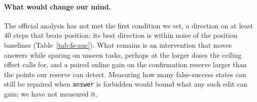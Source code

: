 \paragraph{What would change our mind.} The official analysis has not met the first condition we set, a direction on at least 40 \fsp{} steps that beats position: its best direction is within noise of the position baselines (Table~\ref{tab:fs-auc}). What remains is an intervention that moves \fsp{} answers while sparing \fsm{} on unseen tasks, perhaps at the larger doses the ceiling effect calls for, and a paired online gain on the confirmation reserve larger than the \onMde{} points our reserve can detect. Measuring how many false-success states can still be repaired when \texttt{answer} is forbidden would bound what any such edit can gain; we have not measured it. %

